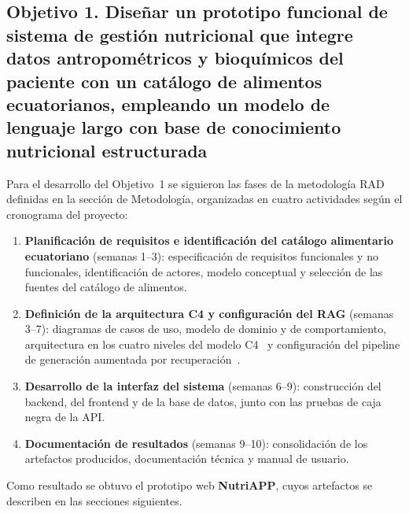 \subsection{Objetivo 1. Diseñar un prototipo funcional de sistema de gestión nutricional que integre datos antropométricos y bioquímicos del paciente con un catálogo de alimentos ecuatorianos, empleando un modelo de lenguaje largo con base de conocimiento nutricional estructurada}

Para el desarrollo del Objetivo~1 se siguieron las fases de la metodología
RAD~\cite{fauzi2023} definidas en la sección de Metodología, organizadas en
cuatro actividades según el cronograma del proyecto:

\begin{enumerate}[leftmargin=2em]
  \item \textbf{Planificación de requisitos e identificación del catálogo
        alimentario ecuatoriano} (semanas 1--3): especificación de requisitos
        funcionales y no funcionales, identificación de actores, modelo
        conceptual y selección de las fuentes del catálogo de alimentos.
  \item \textbf{Definición de la arquitectura C4 y configuración del RAG}
        (semanas 3--7): diagramas de casos de uso, modelo de dominio y de
        comportamiento, arquitectura en los cuatro niveles del modelo
        C4~\cite{brown2024c4} y configuración del pipeline de generación
        aumentada por recuperación~\cite{lewis2020}.
  \item \textbf{Desarrollo de la interfaz del sistema} (semanas 6--9):
        construcción del backend, del frontend y de la base de datos, junto con
        las pruebas de caja negra de la API.
  \item \textbf{Documentación de resultados} (semanas 9--10): consolidación de
        los artefactos producidos, documentación técnica y manual de usuario.
\end{enumerate}

Como resultado se obtuvo el prototipo web \textbf{NutriAPP}, cuyos artefactos
se describen en las secciones siguientes.
